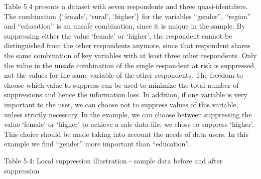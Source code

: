 \documentclass[letterpaper,10pt,english]{sphinxmanual}
\begin{document}
Table 5.4 presents a dataset with seven respondents and three
quasi-identifiers. The combination \{‘female’, ‘rural’, ‘higher’\} for the
variables “gender”, “region” and “education” is an unsafe combination,
since it is unique in the sample. By suppressing either the value
‘female’ or ‘higher’, the respondent cannot be distinguished from the
other respondents anymore, since that respondent shares the same
combination of key variables with at least three other respondents. Only
the value in the unsafe combination of the single respondent at risk is
suppressed, not the values for the same variable of the other
respondents. The freedom to choose which value to suppress can be used
to minimize the total number of suppressions and hence the information
loss. In addition, if one variable is very important to the user, we can
choose not to suppress values of this variable, unless strictly
necessary. In the example, we can choose between suppressing the value
‘female’ or ‘higher’ to achieve a safe data file; we chose to suppress
‘higher’. This choice should be made taking into account the needs of
data users. In this example we find “gender” more important than
“education”.

Table 5.4: Local suppression illustration - sample data before and after
suppression
\end{document}
